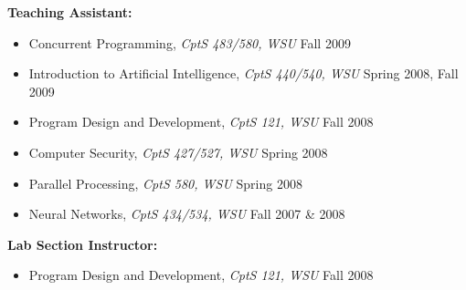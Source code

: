 \textbf{Teaching Assistant:}
	\begin{itemize}
		\item{Concurrent Programming, \textit{CptS 483/580, WSU} \hfill Fall 2009}
		\item{Introduction to Artificial Intelligence, \textit{CptS 440/540, WSU} \hfill Spring 2008, Fall 2009}
		\item{Program Design and Development, \textit{CptS 121, WSU} \hfill Fall 2008}
		\item{Computer Security, \textit{CptS 427/527, WSU} \hfill Spring 2008}
		\item{Parallel Processing, \textit{CptS 580, WSU} \hfill Spring 2008}
		\item{Neural Networks, \textit{CptS 434/534, WSU} \hfill Fall 2007 \& 2008}
	\end{itemize}

\textbf{Lab Section Instructor:}
	\begin{itemize}
		\item{Program Design and Development, \textit{CptS 121, WSU} \hfill Fall 2008}
	\end{itemize}
